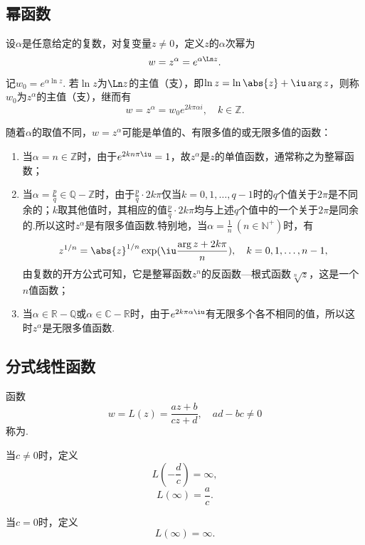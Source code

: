 \subsection{幂函数}
\begin{definition}
设\(\alpha\)是任意给定的复数，对复变量\(z \neq 0\)，定义\(z\)的\(\alpha\)次幂为\[
w = z^\alpha = e^{\alpha \Ln z}.
\]

记\(w_0 = e^{\alpha \ln z}\).
若\(\ln z\)为\(\Ln z\)的主值（支），即\(\ln z = \ln\abs{z} + \iu \arg z\)，则称\(w_0\)为\(z^\alpha\)的主值（支），继而有\[
w = z^\alpha = w_0 e^{2k\pi\alpha i}, \quad k\in\mathbb{Z}.
\]
\end{definition}

\begin{property}
随着\(\alpha\)的取值不同，\(w=z^\alpha\)可能是单值的、有限多值的或无限多值的函数：
\begin{enumerate}
\item 当\(\alpha=n\in\mathbb{Z}\)时，由于\(e^{2 k n \pi \iu}=1\)，故\(z^\alpha\)是\(z\)的单值函数，通常称之为整幂函数；
\item 当\(\alpha=\frac{p}{q}\in\mathbb{Q}-\mathbb{Z}\)时，由于\(\frac{p}{q} \cdot 2 k \pi\)仅当\(k=0,1,\dots,q-1\)时的\(q\)个值关于\(2\pi\)是不同余的；\(k\)取其他值时，其相应的值\(\frac{p}{q} \cdot 2 k \pi\)均与上述\(q\)个值中的一个关于\(2\pi\)是同余的.所以这时\(z^\alpha\)是有限多值函数.特别地，当\(\alpha=\frac{1}{n}\ (n\in\mathbb{N}^+)\)时，有\[
z^{1/n} = \abs{z}^{1/n} \exp(\iu\frac{\arg z + 2 k \pi}{n}), \quad k=0,1,\dotsc,n-1,
\]由复数的开方公式可知，它是整幂函数\(z^n\)的反函数---根式函数\(\sqrt[n]{z}\)，这是一个\(n\)值函数；
\item 当\(\alpha\in\mathbb{R}-\mathbb{Q}\)或\(\alpha\in\mathbb{C}-\mathbb{R}\)时，由于\(e^{2 k \pi \alpha \iu}\)有无限多个各不相同的值，所以这时\(z^\alpha\)是无限多值函数.
\end{enumerate}
\end{property}

\subsection{分式线性函数}
\begin{definition}
函数\[
w = L(z) = \frac{a z + b}{c z + d}, \quad ad-bc \neq 0
\]称为.

当\(c \neq 0\)时，定义\[
L\left(-\frac{d}{c}\right) = \infty,
\]\[
L(\infty) = \frac{a}{c}.
\]

当\(c = 0\)时，定义\[
L(\infty) = \infty.
\]
\end{definition}
